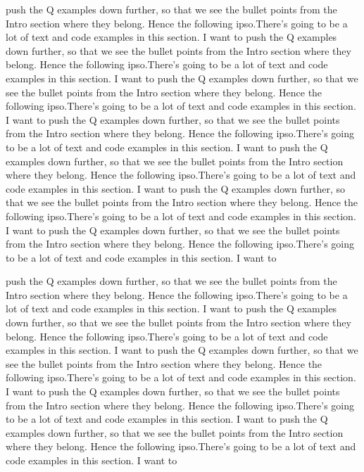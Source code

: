 \documentclass[preprint]{sigplanconf}
\begin{document}
push the Q examples down further, so that we see the bullet points from the
Intro section where they belong.  Hence the following ipso.There's going to be a
lot of text and code examples in this section.  I want to
push the Q examples down further, so that we see the bullet points from the
Intro section where they belong.  Hence the following ipso.There's going to be a
lot of text and code examples in this section.  I want to
push the Q examples down further, so that we see the bullet points from the
Intro section where they belong.  Hence the following ipso.There's going to be a
lot of text and code examples in this section.  I want to
push the Q examples down further, so that we see the bullet points from the
Intro section where they belong.  Hence the following ipso.There's going to be a
lot of text and code examples in this section.  I want to
push the Q examples down further, so that we see the bullet points from the
Intro section where they belong.  Hence the following ipso.There's going to be a
lot of text and code examples in this section.  I want to
push the Q examples down further, so that we see the bullet points from the
Intro section where they belong.  Hence the following ipso.There's going to be a
lot of text and code examples in this section.  I want to
push the Q examples down further, so that we see the bullet points from the
Intro section where they belong.  Hence the following ipso.There's going to be a
lot of text and code examples in this section.  I want to

push the Q examples down further, so that we see the bullet points from the
Intro section where they belong.  Hence the following ipso.There's going to be a
lot of text and code examples in this section.  I want to
push the Q examples down further, so that we see the bullet points from the
Intro section where they belong.  Hence the following ipso.There's going to be a
lot of text and code examples in this section.  I want to
push the Q examples down further, so that we see the bullet points from the
Intro section where they belong.  Hence the following ipso.There's going to be a
lot of text and code examples in this section.  I want to
push the Q examples down further, so that we see the bullet points from the
Intro section where they belong.  Hence the following ipso.There's going to be a
lot of text and code examples in this section.  I want to
push the Q examples down further, so that we see the bullet points from the
Intro section where they belong.  Hence the following ipso.There's going to be a
lot of text and code examples in this section.  I want to
\end{document}
